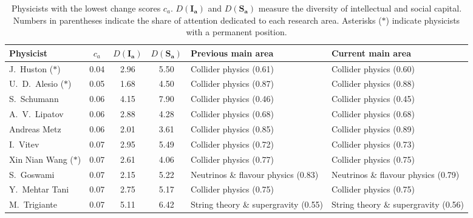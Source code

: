 \begin{table}[H]
\centering
\caption{Physicists with the lowest change scores $c_a$. $D(\bm{I_a})$ and $D(\bm{S_a})$ measure the diversity of intellectual and social capital. Numbers in parentheses indicate the share of attention dedicated to each research area. Asterisks ($\ast$) indicate physicists with a permanent position.}
\label{table:low_change}
\begin{tabular}{p{}|c|c|c|b{}|b{}}
\toprule
              Physicist & $c_a$ & $D(\bm{I_a})$ & $D(\bm{S_a})$ &                   Previous main area &                       Current main area \\
\midrule
     J.~Huston ($\ast$) &  0.04 &          2.96 &          5.50 &              Collider physics (0.61) &              Collider physics (0.60)\\ \hline
  U.~D.~Alesio ($\ast$) &  0.05 &          1.68 &          4.50 &              Collider physics (0.87) &              Collider physics (0.88)\\ \hline
            S.~Schumann &  0.06 &          4.15 &          7.90 &              Collider physics (0.46) &              Collider physics (0.45)\\ \hline
          A.~V.~Lipatov &  0.06 &          2.88 &          4.28 &              Collider physics (0.68) &              Collider physics (0.68)\\ \hline
           Andreas Metz &  0.06 &          2.01 &          3.61 &              Collider physics (0.85) &              Collider physics (0.89)\\ \hline
               I.~Vitev &  0.07 &          2.95 &          5.49 &              Collider physics (0.72) &              Collider physics (0.73)\\ \hline
 Xin Nian Wang ($\ast$) &  0.07 &          2.61 &          4.06 &              Collider physics (0.77) &              Collider physics (0.75)\\ \hline
             S.~Goswami &  0.07 &          2.15 &          5.22 &  Neutrinos \& flavour physics (0.83) &  Neutrinos \& flavour physics (0.79)\\ \hline
         Y.~Mehtar Tani &  0.07 &          2.75 &          5.17 &              Collider physics (0.75) &              Collider physics (0.75)\\ \hline
           M.~Trigiante &  0.07 &          5.11 &          6.42 & String theory \& supergravity (0.55) & String theory \& supergravity (0.56)\\ \hline

\end{tabular}
\end{table}
